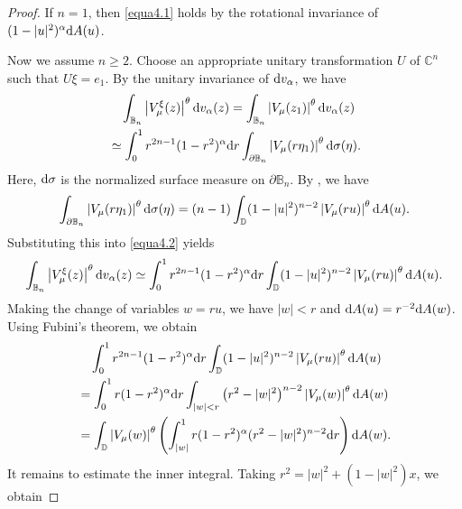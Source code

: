 \documentclass[preprint,12pt,times]{elsarticle}
\theoremstyle{definition}
\theoremstyle{remark}
\numberwithin{equation}{section}
\begin{document}
\begin{proof}
If $n=1$, then \eqref{equa4.1} holds by the rotational invariance of $(1-|u|^2)^{\alpha}{\rm d}A(u)$. 

Now we assume $n\geq 2$. Choose an appropriate unitary transformation $U$ of $\mathbb{C}^n$ such that $U\xi=e_1$. By the unitary invariance of ${\rm d}v_{\alpha}$, we have
\begin{equation}\label{equa4.2}
\begin{split}
&\quad \int_{\mathbb{B}_n}\left|V_{\mu}^{\xi}(z)\right|^{\theta}{\rm d}v_{\alpha}(z)=\int_{\mathbb{B}_n}\left|V_{\mu}(z_1)\right|^{\theta}{\rm d}v_{\alpha}(z)\\
&\simeq \int_{0}^1r^{2n-1}(1-r^2)^{\alpha}{\rm d}r\int_{\partial\mathbb{B}_n}\left|V_{\mu}(r\eta_1)\right|^{\theta}{\rm d}\sigma(\eta).
\end{split}
\end{equation}
Here, ${\rm d}\sigma$ is the normalized surface measure on $\partial\mathbb{B}_n$. By \cite[Lemma 1.9]{Zhu2005}, we have
\begin{align*}
\int_{\partial\mathbb{B}_n}\left|V_{\mu}(r\eta_1)\right|^{\theta}{\rm d}\sigma(\eta)=(n-1)\int_{\mathbb{D}}(1-|u|^2)^{n-2}\left|V_{\mu}(ru)\right|^{\theta}{\rm d}A(u).
\end{align*}
Substituting this into \eqref{equa4.2} yields
\begin{align}\label{equa4.003}
\int_{\mathbb{B}_n}\left|V_{\mu}^{\xi}(z)\right|^{\theta}{\rm d}v_{\alpha}(z)\simeq \int_{0}^1 r^{2n-1}(1-r^2)^{\alpha}{\rm d}r\int_{\mathbb{D}}(1-|u|^2)^{n-2}\left|V_{\mu}(ru)\right|^{\theta}{\rm d}A(u).
\end{align}
Making the change of variables $w=ru$, we have $|w|<r$ and ${\rm d}A(u)=r^{-2}{\rm d}A(w)$. Using Fubini's theorem, we obtain
\begin{equation}\label{equa4.004}
\begin{split}
&\quad \int_{0}^1 r^{2n-1}(1-r^2)^{\alpha}{\rm d}r\int_{\mathbb{D}}(1-|u|^2)^{n-2}\left|V_{\mu}(ru)\right|^{\theta}{\rm d}A(u)\\
&= \int_{0}^1 r(1-r^2)^{\alpha}{\rm d}r\int_{|w|<r}\big(r^2-|w|^2\big)^{n-2}\left|V_{\mu}(w)\right|^{\theta}{\rm d}A(w)\\
&=\int_{\mathbb{D}}\left|V_{\mu}(w)\right|^{\theta}\left(\int_{|w|}^{1}r(1-r^2)^{\alpha}(r^2-|w|^2)^{n-2}{\rm d}r\right){\rm d}A(w).
\end{split}
\end{equation}
It remains to estimate the inner integral. Taking $r^2=|w|^2+(1-|w|^2)x$, we obtain

\end{proof}
\end{document}

